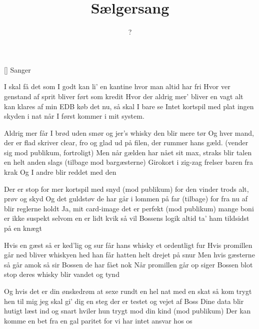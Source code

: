 \documentclass[a4paper,11pt]{article}
\title{Sælgersang}
\author{?}
\begin{document}
\maketitle

\begin{roles}
[] Sanger
\end{roles}

\begin{song}

  I skal få det som I godt kan li'
en kantine hvor man altid har fri
Hvor ver genstand af sprit
bliver ført som kredit
Hvor der aldrig mer' bliver en vagt
alt kan klares af min EDB
køb det nu, så skal I bare se
Intet kortspil med plat
ingen skyden i nat
når I først kommer i mit system.

Aldrig mer får I brød uden smør
og jer's whisky den blir mere tør
Og hver mand, der er flad
skriver clear, fro og glad
ud på filen, der rummer hans gæld.
(vender sig mod publikum, fortroligt)
Men når gælden har nået sit max,
straks blir talen en helt anden slags
(tilbage mod bargæsterne)
Girokort i zig-zag
frelser baren fra krak
Og I andre blir reddet med den

Der er stop for mer kortspil med snyd
(mod publikum)
for den vinder trods alt, prøv og skyd
Og det guldstøv de har
går i lommen på far
(tilbage)
for fra nu af blir reglerne holdt
Ja, mit card-image det er perfekt
(mod publikum)
mange boni er ikke suspekt
selvom en er lidt kvik
så vil Bossens logik
altid ta' ham tildsidst på en knægt

Hvis en gæst så er ked'lig og sur
får hans whisky et ordentligt fur
Hvis promillen går ned
bliver whiskyen hed
han får hatten helt drejet på snur
Men hvis gæsterne så går amok
så sir Bossen de har fået nok
Når promillen går op
siger Bossen blot stop
deres whisky blir vandet og tynd

Og hvis det er din ønskedrøm at
sexe rundt en hel nat med en skat
så kom trygt hen til mig
jeg skal gi' dig en steg
der er testet og vejet af Boss
Dine data blir hutigt læst ind
og snart hviler hun trygt mod din kind
(mod publikum)
Der kan komme en bet
fra en gal paritet
for vi har intet ansvar hos os
\end{song}
\end{document}
